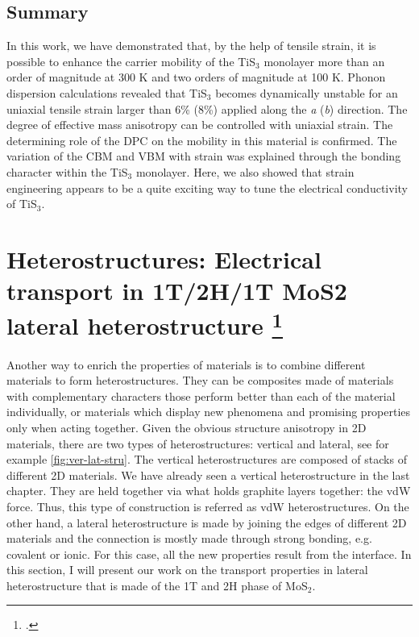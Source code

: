 \subsection{Summary}

In this work, we have demonstrated that, by the help of tensile strain, it is possible to enhance the carrier mobility of the TiS$_3$ monolayer more than an order of magnitude at 300 K and two orders of magnitude at 100 K. Phonon dispersion calculations revealed that TiS$_3$ becomes dynamically unstable for an uniaxial tensile strain larger than 6\% (8\%) applied along the \textit{a} (\textit{b}) direction. The degree of effective mass anisotropy can be controlled with uniaxial strain. The determining role of the DPC on the mobility in this material is confirmed. The variation of the CBM and VBM with strain was explained through the bonding character within the TiS$_3$ monolayer.  Here, we also showed that strain engineering appears to be a quite exciting way to tune the electrical conductivity of TiS$_3$.

\section[Heterostructures: Electrical transport in 1T/2H/1T MoS2 lateral heterostructure]{Heterostructures: Electrical transport in 1T/2H/1T MoS2 lateral heterostructure \footcite[This work is submitted:][]{Aierken2017.transport} \label{trans_mx2}}

Another way to enrich the properties of materials is to combine different materials to form heterostructures\cite{Geim_Grigorieva_2013,Liu2016b,Pomerantseva2017}. They can be composites made of materials with complementary characters those perform better than each of the material individually, or materials which display new phenomena and promising properties only when acting together.  Given the obvious structure anisotropy in 2D materials, there are two types of heterostructures: vertical and lateral\cite{Allain2015}, see for example \autoref{fig:ver-lat-stru}. The vertical heterostructures are composed of stacks of different 2D materials. We have already seen a vertical heterostructure in the last chapter. They are held together via what holds graphite layers together: the vdW force. Thus, this type of construction is referred as vdW heterostructures.  On the other hand, a lateral heterostructure\cite{Jena2014,Chhowalla2015} is made by joining the edges of different 2D materials and the connection is mostly made through strong bonding, e.g. covalent or ionic. For this case, all the new properties result from the interface. In this section, I will present our work on the transport properties in lateral heterostructure that is made of the 1T and 2H phase of MoS$_2$. 

